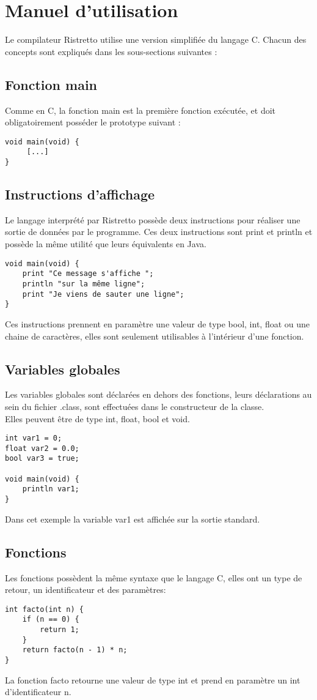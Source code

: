 \documentclass[12pt]{report}
\begin{document}
\section{Manuel d'utilisation}
Le compilateur Ristretto utilise une version simplifiée du langage C. Chacun des\\
concepts sont expliqués dans les sous-sections suivantes :
\subsection{Fonction main}
Comme en C, la fonction main est la première fonction exécutée, et doit\\
obligatoirement posséder le prototype suivant :
\begin{verbatim}
void main(void) {
     [...]
}
\end{verbatim}
\subsection{Instructions d'affichage}
Le langage interprété par Ristretto possède deux instructions pour réaliser une sortie de données par le programme. Ces deux instructions sont print et println et possède la même utilité que leurs équivalents en Java.
\begin{verbatim}
void main(void) {
    print "Ce message s'affiche ";
    println "sur la même ligne";
    print "Je viens de sauter une ligne";
}
\end{verbatim}
Ces instructions prennent en paramètre une valeur de type bool, int, float ou une chaine de caractères, elles sont seulement utilisables à l'intérieur d'une fonction.
\subsection{Variables globales}
Les variables globales sont déclarées en dehors des fonctions, leurs déclarations au sein du fichier .class, sont effectuées dans le constructeur de la classe.\\
Elles peuvent être de type int, float, bool et void.
\begin{verbatim}
int var1 = 0;
float var2 = 0.0;
bool var3 = true;

void main(void) {
    println var1;
}
\end{verbatim}
Dans cet exemple la variable var1 est affichée sur la sortie standard.
\newpage
\subsection{Fonctions}
Les fonctions possèdent la même syntaxe que le langage C, elles ont un type de retour, un identificateur et des paramètres:
\begin{verbatim}
int facto(int n) {
    if (n == 0) {
	    return 1;
    }
    return facto(n - 1) * n;
}
\end{verbatim}
La fonction facto retourne une valeur de type int et prend en paramètre un int d'identificateur n.
\end{document}
